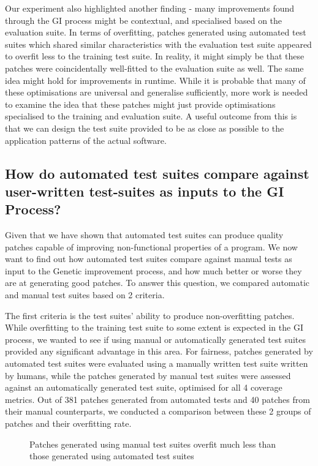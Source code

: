 \documentclass[titlepage]{article}
\begin{document}
Our experiment also highlighted another finding - many improvements found through the GI process might be contextual, and specialised based on the evaluation suite. In terms of overfitting, patches generated using automated test suites which shared similar characteristics with the evaluation test suite appeared to overfit less to the training test suite. In reality, it might simply be that these patches were coincidentally well-fitted to the evaluation suite as well. The same idea might hold for improvements in runtime.  While it is probable that many of these optimisations are universal and generalise sufficiently, more work is needed to examine the idea that these patches might just provide optimisations specialised to the training and evaluation suite. A useful outcome from this is that we can design the test suite provided to be as close as possible to the application patterns of the actual software. 


\subsection{How do automated test suites compare against user-written test-suites as inputs to the GI Process?}

Given that we have shown that automated test suites can produce quality patches capable of improving non-functional properties of a program. We now want to find out how automated test suites compare against manual tests as input to the Genetic improvement process, and how much better or worse they are at generating good patches. To answer this question, we compared automatic and manual test suites based on 2 criteria.

The first criteria is the test suites’ ability to produce non-overfitting patches. While overfitting to the training test suite to some extent is expected in the GI process, we wanted to see if using manual or automatically generated test suites provided any significant advantage in this area. For fairness, patches generated by automated  test suites were evaluated using a manually written test suite written by humans, while the patches generated by manual test suites were assessed against an automatically generated test suite, optimised for all 4 coverage metrics. Out of 381 patches generated from automated tests and 40 patches from their manual counterparts, we conducted a comparison between these 2 groups of patches and their overfitting rate. 
\begin{figure}
    \begin{center}
        \resizebox{0.8\textwidth}{!}{}
    \end{center}
    \caption{Patches generated using manual test suites overfit much less than those generated using automated test suites}
\end{figure}
\end{document}
